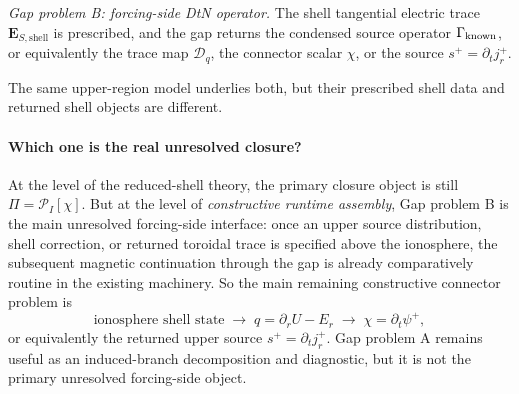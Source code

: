\documentclass[11pt,a4paper]{article}
\begin{document}
\emph{Gap problem B: forcing-side DtN operator.}
The shell tangential electric trace \(\mathbf E_{S,\mathrm{shell}}\) is
prescribed, and the gap returns the condensed source operator
\(\Gamma_{\rm known}\), or equivalently the trace map \(\mathcal D_q\), the
connector scalar \(\chi\), or the source \(s^+=\partial_t j_r^+\).

The same upper-region model underlies both, but their prescribed shell data
and returned shell objects are different.

\paragraph{Which one is the real unresolved closure?}
At the level of the reduced-shell theory, the primary closure object is still
\(\Pi=\mathcal P_I[\chi]\). But at the level of \emph{constructive runtime
assembly}, Gap problem B is the main unresolved forcing-side interface:
once an upper source distribution, shell correction, or returned toroidal
trace is specified above the ionosphere, the subsequent magnetic continuation
through the gap is already comparatively routine in the existing machinery.
So the main remaining constructive connector problem is
\[
\text{ionosphere shell state}
\;\to\;
q=\partial_rU-E_r
\;\to\;
\chi=\partial_t\psi^+,
\]
or equivalently the returned upper source \(s^+=\partial_t j_r^+\). Gap
problem A remains useful as an induced-branch decomposition and diagnostic,
but it is not the primary unresolved forcing-side object.
\end{document}
